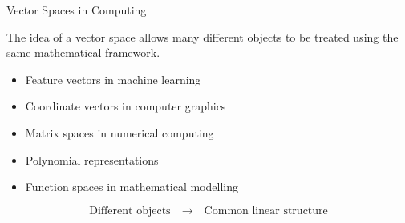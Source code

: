
\begin{frame}{Vector Spaces in Computing}

The idea of a vector space allows many different objects
to be treated using the same mathematical framework.

\vspace{0.4cm}

\begin{itemize}
    \item Feature vectors in machine learning
    \item Coordinate vectors in computer graphics
    \item Matrix spaces in numerical computing
    \item Polynomial representations
    \item Function spaces in mathematical modelling
\end{itemize}

\begin{center}

\[
\boxed{
\text{Different objects}
\quad\longrightarrow\quad
\text{Common linear structure}
}
\]

\end{center}

\end{frame}
